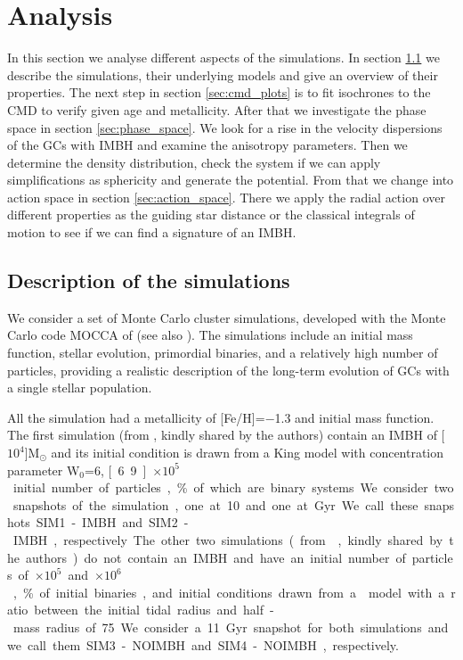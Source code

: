 \section{Analysis}
In this section we analyse different aspects of the simulations. In section \ref{sec:description} we describe the simulations, their underlying models and give an overview of their properties. The next step in section \ref{sec:cmd_plots} is to fit isochrones to the \ac{CMD} to verify given age and metallicity. After that we investigate the phase space in section \ref{sec:phase_space}. We look for a rise in the velocity dispersions of the \acp{GC} with \ac{IMBH} and examine the anisotropy parameters. Then we determine the density distribution, check the system if we can apply simplifications as sphericity and generate the potential. From that we change into action space in section \ref{sec:action_space}. There we apply the radial action over different properties as the guiding star distance or the classical integrals of motion to see if we can find a signature of an \ac{IMBH}.
\subsection{Description of the simulations}\label{sec:description}
We consider a set of Monte Carlo cluster simulations, developed with the Monte Carlo
code MOCCA of \citet{2013MNRAS.429.1221H} (see also \citet{1998MNRAS.298.1239G}). The simulations
include an initial mass function, stellar evolution, primordial binaries, and a
relatively high number of particles, providing a realistic description of the
long-term evolution of \acp{GC} with a single stellar population.
\par All the simulation had a metallicity of [Fe/H]=$-$1.3 and \citet{2001MNRAS.322..231K} initial mass function. The first simulation (from \citet{2015MNRAS.454.3150G}, kindly shared by the authors) contain an \ac{IMBH} of \unit[$10^4$]{M$_\odot$} and its initial condition is drawn from a King model with concentration parameter W$_0 $=6, \unit[6.9]{$\times10^5$} initial number of particles, \unit[95]{\%} of which are binary systems. We consider two snapshots of the simulation, one at 10 and one at \unit[7]{Gyr}. We call these snapshots SIM1-IMBH and SIM2-IMBH, respectively. The other two simulations (from \citet{2010MNRAS.407.1946D}, kindly shared by the authors) do not contain an \ac{IMBH} and have an initial number of particles of \unit[5]{$\times10^5$} and \unit[2]{$\times10^6$}, \unit[10]{\%} of initial binaries, and initial conditions drawn from a \citet{1911MNRAS..71..460P} model with a ratio between the initial tidal radius and half-mass radius of 75. We consider a 11 Gyr snapshot for both simulations and we call them SIM3-NOIMBH and SIM4-NOIMBH, respectively.

